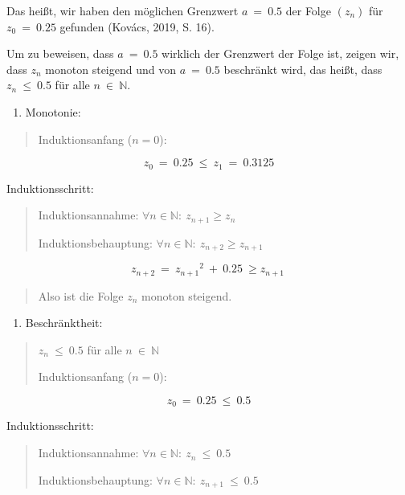 \documentclass[a4paper, 12pt]{book}
\begin{document}
\begin{longtable}[]
\begin{minipage}[b]{\linewidth}
Das heißt, wir haben den möglichen Grenzwert \(a\  = \ 0.5\) der Folge
\(\left( z_{n} \right)\) für \(z_{0}\  = \ 0.25\) gefunden (Kovács,
2019, S. 16).

Um zu beweisen, dass \(a\  = \ 0.5\) wirklich der Grenzwert der Folge
ist, zeigen wir, dass \(z_{n}\) monoton steigend und von \(a\  = \ 0.5\)
beschränkt wird, das heißt, dass \(z_{n}\  \leq \ 0.5\) für alle
\(n\mathbb{\  \in \ N}\).

\begin{enumerate}
\def\labelenumi{\arabic{enumi})}
\item
  Monotonie:
\end{enumerate}

\begin{quote}
Induktionsanfang (\(n = 0\)):
\end{quote}

\[z_{0}\  = \ 0.25\  \leq \ z_{1}\  = \ 0.3125\]

Induktionsschritt:

\begin{quote}
Induktionsannahme: \(\forall n \in \mathbb{N:\ }z_{n + 1} \geq z_{n}\)

Induktionsbehauptung:
\(\forall n \in \mathbb{N:\ }z_{n + 2} \geq z_{n + 1}\)
\end{quote}

\[z_{n + 2}\  = \ {z_{n + 1}}^{2}\  + \ 0.25\  \geq z_{n + 1}\ \]

\begin{quote}
Also ist die Folge \(z_{n}\) monoton steigend.
\end{quote}

\begin{enumerate}
\def\labelenumi{\arabic{enumi})}
\setcounter{enumi}{1}
\item
  Beschränktheit:
\end{enumerate}

\begin{quote}
\(z_{n}\  \leq \ 0.5\) für alle \(n\mathbb{\  \in \ N}\)

Induktionsanfang (\(n = 0\)):
\end{quote}

\[z_{0}\  = \ 0.25\  \leq \ 0.5\]

Induktionsschritt:

\begin{quote}
Induktionsannahme: \(\forall n \in \mathbb{N:\ }z_{n}\  \leq \ 0.5\)

Induktionsbehauptung:
\(\forall n \in \mathbb{N:\ }z_{n + 1}\  \leq \ 0.5\)
\end{quote}


\end{minipage}
\end{longtable}
\end{document}
